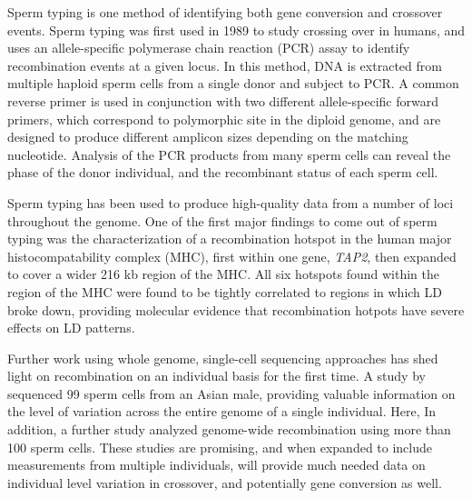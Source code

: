Sperm typing is one method of identifying both gene conversion and crossover events.
Sperm typing was first used in 1989 to study crossing over in humans\cite{Cui1989}, and uses
an allele-specific polymerase chain reaction (PCR) assay to identify recombination events at a given locus.
In this method, DNA is extracted from multiple haploid sperm cells from a single donor and subject to PCR.
A common reverse primer is used in conjunction with two different allele-specific forward primers, which correspond to polymorphic site in the diploid genome, and are designed to produce different amplicon sizes depending on the matching nucleotide.
Analysis of the PCR products from many sperm cells can reveal the phase of the donor individual, and the recombinant status of each sperm cell.

Sperm typing has been used to produce high-quality data from a number of loci throughout the genome.
One of the first major findings to come out of sperm typing was the characterization of a recombination hotspot in the human major histocompatability complex (MHC), first within one gene, \textit{TAP2}\cite{Jeffreys2000}, then expanded to cover a wider 216 kb region of the MHC\cite{Jeffreys2001}.
All six hotspots found within the region of the MHC were found to be tightly correlated to regions in which LD broke down, providing molecular evidence that recombination hotpots have severe effects on LD patterns.



Further work using whole genome, single-cell sequencing approaches has shed light on recombination on an individual basis for the first time.
A study by \citet{Lu2012} sequenced 99 sperm cells from an Asian male, providing valuable information on the level of variation across the entire genome of a single individual.
Here,
In addition, a further study analyzed genome-wide recombination using more than 100 sperm cells\cite{Wang2012}.
These studies are promising, and when expanded to include measurements from multiple individuals, will provide much needed data on individual level variation in crossover, and potentially gene conversion as well.


